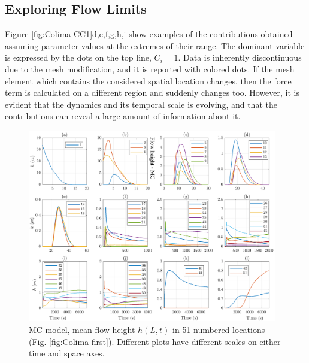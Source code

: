 \documentclass{article}
\begin{document}

\subsection{Exploring Flow Limits} \label{lhs_des_colima}
Figure \ref{fig:Colima-CC1}d,e,f,g,h,i show examples of the  contributions obtained assuming parameter values at the extremes of their range. The dominant variable is expressed by the dots on the top line, $C_i=1$. Data is inherently discontinuous due to the mesh modification, and it is reported with colored dots. If the mesh element which contains the considered spatial location changes, then the force term is calculated on a different region and suddenly changes too. However, it is evident that the dynamics and its temporal scale is evolving, and that the  contributions can reveal a large amount of information about it.
\begin{figure}[H]
         \centering
        \includegraphics[width=0.97\textwidth]{figures/Colima/HeightMC_BAF.png}
        \caption{MC model, mean flow height $h(L,t)$ in 51 numbered locations (Fig. \ref{fig:Colima-first}). Different plots have different scales on either time and space axes.}
        \label{fig:BAF-H-MC}
\end{figure}
\end{document}
